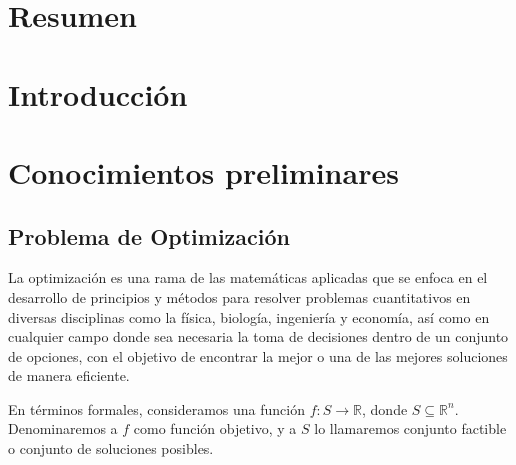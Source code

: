 \documentclass[12pt,titlepage,twoside,openright]{book}
\begin{document}
\frontmatter{}



\pagestyle{plain}
	

\tableofcontents
\newpage 
\listoffigures	




\mainmatter{}
\pagestyle{fancy}
\renewcommand{\chaptermark}[1]{%
\markboth{\chaptername
\ \thechapter.\ #1}{}}
\fancyhead[RO,LE]{\bfseries \thepage}
\fancyfoot{}
\setlength{\parindent}{0pt}
\setlength{\parskip}{1.5ex}



\chapter{Resumen}



\chapter{Introducci\'on}
\chapter{Conocimientos preliminares}
\section{Problema de Optimizaci\'on}

La optimizaci\'on es una rama de las matem\'aticas aplicadas que se enfoca en el desarrollo de principios y m\'etodos para resolver problemas cuantitativos en diversas disciplinas como la f\'isica, biolog\'ia, ingenier\'ia y econom\'ia, as\'i como en cualquier campo donde sea necesaria la toma de decisiones dentro de un conjunto de opciones, con el objetivo de encontrar la mejor o una de las mejores soluciones de manera eficiente.

En t\'erminos formales, consideramos una funci\'on \( f : S \rightarrow \mathbb{R} \), donde \( S \subseteq \mathbb{R}^n \). Denominaremos a \( f \) como funci\'on objetivo, y a \( S \) lo llamaremos conjunto factible o conjunto de soluciones posibles.
\end{document}
